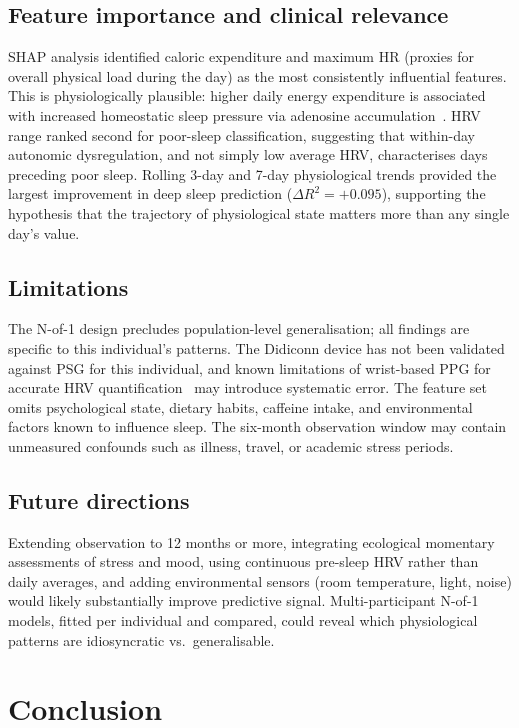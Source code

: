 \documentclass[fleqn,10pt]{wlscirep}
\begin{document}
\subsection*{Feature importance and clinical relevance}
SHAP analysis identified caloric expenditure and maximum HR (proxies for overall physical load during the day) as the most consistently influential features. This is physiologically plausible: higher daily energy expenditure is associated with increased homeostatic sleep pressure via adenosine accumulation~\cite{alnawwar2023}. HRV range ranked second for poor-sleep classification, suggesting that within-day autonomic dysregulation, and not simply low average HRV, characterises days preceding poor sleep. Rolling 3-day and 7-day physiological trends provided the largest improvement in deep sleep prediction ($\Delta R^2 = +0.095$), supporting the hypothesis that the trajectory of physiological state matters more than any single day's value.

\subsection*{Limitations}
The N-of-1 design precludes population-level generalisation; all findings are specific to this individual's patterns. The Didiconn device has not been validated against PSG for this individual, and known limitations of wrist-based PPG for accurate HRV quantification~\cite{leeTW2023} may introduce systematic error. The feature set omits psychological state, dietary habits, caffeine intake, and environmental factors known to influence sleep. The six-month observation window may contain unmeasured confounds such as illness, travel, or academic stress periods.

\subsection*{Future directions}
Extending observation to 12 months or more, integrating ecological momentary assessments of stress and mood, using continuous pre-sleep HRV rather than daily averages, and adding environmental sensors (room temperature, light, noise) would likely substantially improve predictive signal. Multi-participant N-of-1 models, fitted per individual and compared, could reveal which physiological patterns are idiosyncratic vs.\ generalisable.

\section*{Conclusion}
\end{document}
